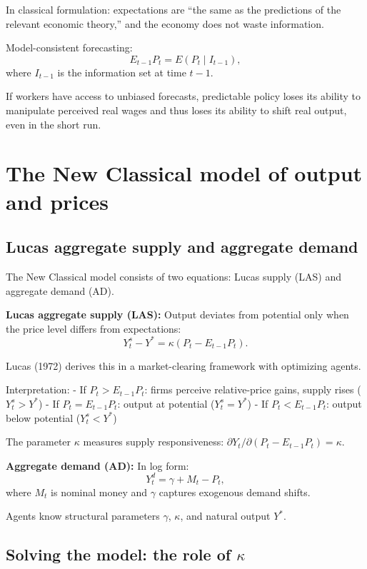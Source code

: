 \documentclass[
  letterpaper,
  DIV=11,
  numbers=noendperiod]{scrartcl}
\begin{document}
In classical formulation: expectations are ``the same as the predictions
of the relevant economic theory,'' and the economy does not waste
information.

Model-consistent forecasting: \[E_{t-1}P_t = E(P_t \mid I_{t-1}),\]
where \(I_{t-1}\) is the information set at time \(t-1\).

If workers have access to unbiased forecasts, predictable policy loses
its ability to manipulate perceived real wages and thus loses its
ability to shift real output, even in the short run.

\section{The New Classical model of output and
prices}\label{the-new-classical-model-of-output-and-prices}

\subsection{Lucas aggregate supply and aggregate
demand}\label{lucas-aggregate-supply-and-aggregate-demand}

The New Classical model consists of two equations: Lucas supply (LAS)
and aggregate demand (AD).

\textbf{Lucas aggregate supply (LAS):} Output deviates from potential
only when the price level differs from expectations:
\[Y_t^s - Y^* = \kappa(P_t - E_{t-1}P_t).\]

Lucas (1972) derives this in a market-clearing framework with optimizing
agents.

Interpretation: - If \(P_t > E_{t-1}P_t\): firms perceive relative-price
gains, supply rises (\(Y_t^s > Y^*\)) - If \(P_t = E_{t-1}P_t\): output
at potential (\(Y_t^s = Y^*\)) - If \(P_t < E_{t-1}P_t\): output below
potential (\(Y_t^s < Y^*\))

The parameter \(\kappa\) measures supply responsiveness:
\(\partial Y_t / \partial(P_t - E_{t-1}P_t) = \kappa\).

\textbf{Aggregate demand (AD):} In log form:
\[Y_t^d = \gamma + M_t - P_t,\] where \(M_t\) is nominal money and
\(\gamma\) captures exogenous demand shifts.

Agents know structural parameters \(\gamma\), \(\kappa\), and natural
output \(Y^*\).

\subsection{\texorpdfstring{Solving the model: the role of
\(\kappa\)}{Solving the model: the role of \textbackslash kappa}}\label{solving-the-model-the-role-of-kappa}
\end{document}
